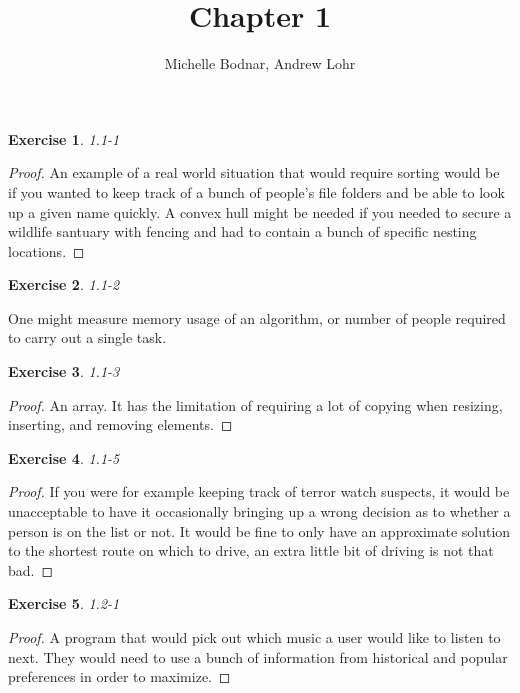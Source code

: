 \documentclass{article}
\title{Chapter 1}
\author{Michelle Bodnar, Andrew Lohr}
\newtheorem{th1}{Exercise}
\begin{document}
\maketitle

\begin{th1}\label{ex1}
1.1-1
\end{th1}
\begin{proof}
An example of a real world situation that would require sorting would be if you wanted to keep track of a bunch of people's file folders and be able to look up a given name quickly. A convex hull might be needed if you needed to secure a wildlife santuary with fencing and had to contain a bunch of specific nesting locations.
\end{proof}

\begin{th1}
1.1-2
\end{th1}
One might measure memory usage of an algorithm, or number of people required to carry out a single task.\\


\begin{th1}\label{ex2}
1.1-3
\end{th1}
\begin{proof}
An array. It has the limitation of requiring a lot of copying when resizing, inserting, and removing elements. 
\end{proof}

\begin{th1}\label{ex3}
1.1-5
\end{th1}
\begin{proof}
If you were for example keeping track of terror watch suspects, it would be unacceptable to have it occasionally bringing up a wrong decision as to whether a person is on the list or not. It would be fine to only have an approximate solution to the shortest route on which to drive, an extra little bit of driving is not that bad.
\end{proof}
\begin{th1}\label{ex4}
1.2-1
\end{th1}
\begin{proof}
A program that would pick out which music a user would like to listen to next. They would need to use a bunch of information from historical and popular preferences in order to maximize.
\end{proof}
\end{document}
